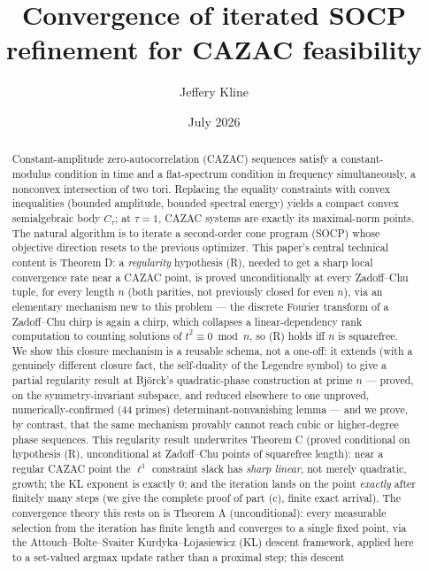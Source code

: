 \documentclass[11pt]{article}
\title{Convergence of iterated SOCP refinement for CAZAC feasibility}
\author{Jeffery Kline}
\date{July 2026}
\theoremstyle{plain}
\theoremstyle{definition}
\theoremstyle{remark}
\begin{document}
\maketitle

\begin{abstract}
Constant-amplitude zero-autocorrelation (CAZAC) sequences satisfy a
constant-modulus condition in time and a flat-spectrum condition in
frequency simultaneously, a nonconvex intersection of two tori. Replacing
the equality constraints with convex inequalities (bounded amplitude,
bounded spectral energy) yields a compact convex semialgebraic body
$C_\tau$; at $\tau=1$, CAZAC systems are exactly its maximal-norm points.
The natural algorithm is to iterate a second-order cone program (SOCP) whose
objective direction resets to the previous optimizer. This paper's
central technical content is Theorem D: a \emph{regularity} hypothesis
(R), needed to get a sharp local convergence rate near a CAZAC point, is
proved unconditionally at every Zadoff--Chu tuple, for every length $n$
(both parities, not previously closed for even $n$), via an elementary
mechanism new to this problem --- the discrete Fourier transform of a
Zadoff--Chu chirp is again a chirp, which collapses a linear-dependency
rank computation to counting solutions of $t^2\equiv0\bmod n$, so (R)
holds iff $n$ is squarefree. We show this closure mechanism is a
reusable schema, not a one-off: it extends (with a genuinely different
closure fact, the self-duality of the Legendre symbol) to give a partial
regularity result at Bj\"orck's quadratic-phase construction at prime
$n$ --- proved, on the symmetry-invariant subspace, and reduced elsewhere
to one unproved, numerically-confirmed (44 primes) determinant-nonvanishing
lemma --- and we prove, by contrast, that the same mechanism provably
cannot reach cubic or higher-degree phase sequences. This regularity
result underwrites Theorem C (proved conditional on hypothesis (R),
unconditional at Zadoff--Chu points of squarefree length): near a regular
CAZAC point the $\ell^1$ constraint slack has \emph{sharp linear}, not
merely quadratic, growth; the KL exponent is exactly $0$; and the
iteration lands on the point \emph{exactly} after finitely many steps
(we give the complete proof of part (c), finite exact arrival). The
convergence theory this rests on is Theorem A (unconditional): every
measurable selection from the iteration has finite length and converges
to a single fixed point, via the Attouch--Bolte--Svaiter
Kurdyka--{\L}ojasiewicz (KL) descent framework, applied here to a
set-valued argmax update rather than a proximal step; this descent

\end{abstract}
\end{document}
